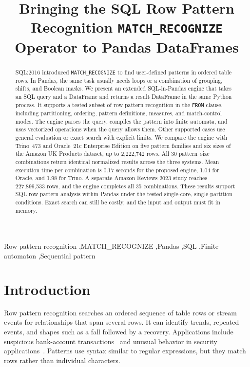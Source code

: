 \documentclass[preprint,12pt,times,a4paper]{elsarticle}
\begin{document}
\begin{frontmatter}

\title{Bringing the SQL Row Pattern Recognition \texttt{MATCH\_RECOGNIZE} Operator to
  Pandas DataFrames}

\begin{abstract}
SQL:2016 introduced \texttt{MATCH\_RECOGNIZE} to find user-defined patterns
in ordered table rows. In Pandas, the same task usually needs loops or a
combination of grouping, shifts, and Boolean masks. We present an extended
SQL-in-Pandas engine that takes an SQL query and a DataFrame and returns a
result DataFrame in the same Python process. It supports a tested subset of row pattern
recognition in the \texttt{FROM} clause, including partitioning, ordering,
pattern definitions, measures, and match-control modes. The engine parses the
query, compiles the pattern into finite automata, and uses vectorized
operations when the query allows them. Other supported cases use general
evaluation or exact search with explicit limits. We compare the engine with
Trino~473 and Oracle~21c Enterprise Edition on five pattern families and six sizes of the
Amazon UK Products dataset, up to 2,222,742 rows. All 30 pattern--size combinations return
identical normalized results across the three systems. Mean execution time
per combination is 0.17 seconds for the proposed engine, 1.04 for Oracle, and
1.98 for Trino. A separate Amazon Reviews 2023 study reaches 227,899,533 rows,
and the engine completes all 35 combinations. These results support SQL row
pattern analysis within Pandas under the tested single-core, single-partition
conditions. Exact search can still be costly, and the input and output must
fit in memory.
\end{abstract}

\begin{keyword}
Row pattern recognition \sep MATCH\_RECOGNIZE \sep Pandas \sep SQL \sep Finite automaton \sep Sequential pattern
\end{keyword}

\end{frontmatter}

\section{Introduction}
Row pattern recognition searches an ordered sequence of table rows or stream
events for relationships that span several rows. It can identify trends,
repeated events, and shapes such as a fall followed by a recovery. Applications
include suspicious bank-account
transactions~\cite{10.5120/ijca2022922446} and unusual behavior in security
applications~\cite{zemke2007pattern}. Patterns use syntax similar to regular expressions,
but they match rows rather than individual characters.
\end{document}
